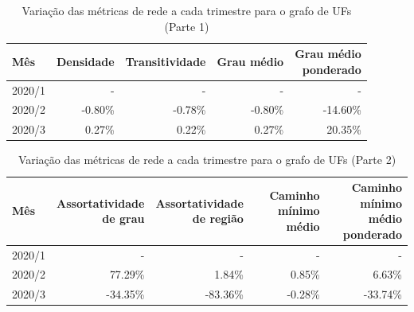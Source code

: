 \begin{table}[htb]
\centering
\caption{Variação das métricas de rede a cada trimestre para o grafo de UFs (Parte 1)}
\label{tab:metricas-redes-pandemia:grafo-trimestral-por-uf1}
\begin{tabular}{l|rrrr}
\toprule
Mês & Densidade & Transitividade & Grau médio & \shortstack{Grau médio\\ponderado} \\
\midrule
2020/1 & - & - & - & - \\
2020/2 & -0.80\% & -0.78\% & -0.80\% & -14.60\% \\
2020/3 &  0.27\% &  0.22\% &  0.27\% &  20.35\% \\
\bottomrule
\end{tabular}
\fdadospesquisa
\end{table}

\begin{table}[htb]
\centering
\caption{Variação das métricas de rede a cada trimestre para o grafo de UFs (Parte 2)}
\label{tab:metricas-redes-pandemia:grafo-trimestral-por-uf2}
\begin{tabular}{l|rrrr}
\toprule
Mês & \shortstack{Assortatividade\\de grau} & \shortstack{Assortatividade\\de região} & \shortstack{Caminho mínimo\\médio} & \shortstack{Caminho mínimo\\médio ponderado} \\
\midrule
2020/1 & - & - & - & - \\
2020/2 &  77.29\% &   1.84\% &  0.85\% &   6.63\% \\
2020/3 & -34.35\% & -83.36\% & -0.28\% & -33.74\% \\
\bottomrule
\end{tabular}
\fdadospesquisa
\end{table}

